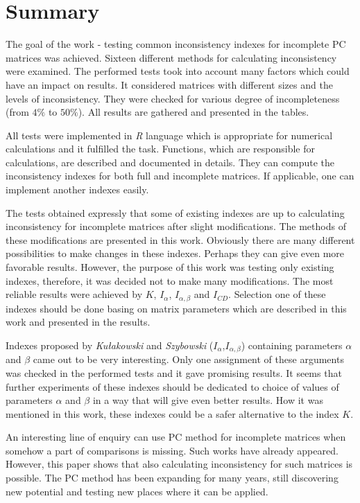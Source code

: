 \chapter{Summary}
\label{sec:summary}

The goal of the work - testing common inconsistency indexes for incomplete PC matrices was achieved. Sixteen different methods for calculating inconsistency were examined. The performed tests took into account many factors which could have an impact on results. It considered matrices with different sizes and the levels of inconsistency. They were checked for various degree of incompleteness (from $4\%$ to $50\%$). All results are gathered and presented in the tables.

All tests were implemented in \textit{R} language which is appropriate for numerical calculations and it fulfilled the task. Functions, which are responsible for calculations, are described and documented in details. They can compute the inconsistency indexes for both full and incomplete matrices. If applicable, one can implement another indexes easily.

The tests obtained expressly that some of existing indexes are up to calculating inconsistency for incomplete matrices after slight modifications. The methods of these modifications are presented in this work. Obviously there are many different possibilities to make changes in these indexes. Perhaps they can give even more favorable results. However, the purpose of this work was testing only existing indexes, therefore, it was decided not to make many modifications. The most reliable results were achieved by $K$, $I_{\alpha}$, $I_{\alpha,\beta}$ and $I_{CD}$. Selection one of these indexes should be done basing on matrix parameters which are described in this work and presented in the results.

Indexes proposed by \textit{Kułakowski} and \textit{Szybowski} ($I_{\alpha}$,$I_{\alpha,\beta}$) containing parameters $\alpha$ and $\beta$ came out to be very interesting. Only one assignment of these arguments was checked in the performed tests and it gave promising results. It seems that further experiments of these indexes should be dedicated to choice of values of parameters $\alpha$ and $\beta$ in a way that will give even better results. How it was mentioned in this work, these indexes could be a safer alternative to the index $K$.

An interesting line of enquiry can use PC method for incomplete matrices when somehow a part of comparisons is missing. Such works have already appeared. However, this paper shows that also calculating inconsistency for such matrices is possible. The PC method has been expanding for many years, still discovering new potential and testing new places where it can be applied.